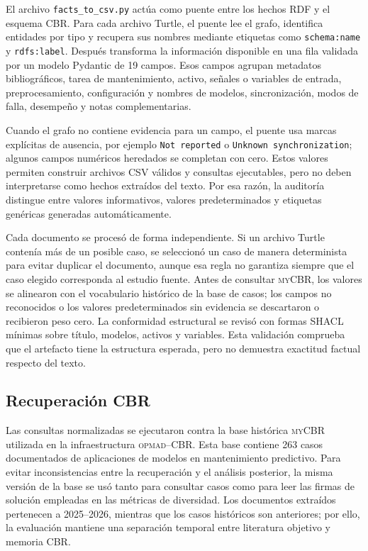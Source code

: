 \documentclass[11pt,a4paper]{article}
\newcommand{\OPMAD}{\textsc{opmad}}
\newcommand{\myCBR}{\textsc{myCBR}}
\begin{document}
El archivo \texttt{facts\_to\_csv.py} actúa como puente entre los hechos RDF y el esquema CBR. Para cada archivo Turtle, el puente lee el grafo, identifica entidades por tipo y recupera sus nombres mediante etiquetas como \texttt{schema:name} y \texttt{rdfs:label}. Después transforma la información disponible en una fila validada por un modelo Pydantic de 19 campos. Esos campos agrupan metadatos bibliográficos, tarea de mantenimiento, activo, señales o variables de entrada, preprocesamiento, configuración y nombres de modelos, sincronización, modos de falla, desempeño y notas complementarias.

Cuando el grafo no contiene evidencia para un campo, el puente usa marcas explícitas de ausencia, por ejemplo \texttt{Not reported} o \texttt{Unknown synchronization}; algunos campos numéricos heredados se completan con cero. Estos valores permiten construir archivos CSV válidos y consultas ejecutables, pero no deben interpretarse como hechos extraídos del texto. Por esa razón, la auditoría distingue entre valores informativos, valores predeterminados y etiquetas genéricas generadas automáticamente.

Cada documento se procesó de forma independiente. Si un archivo Turtle contenía más de un posible caso, se seleccionó un caso de manera determinista para evitar duplicar el documento, aunque esa regla no garantiza siempre que el caso elegido corresponda al estudio fuente. Antes de consultar \myCBR{}, los valores se alinearon con el vocabulario histórico de la base de casos; los campos no reconocidos o los valores predeterminados sin evidencia se descartaron o recibieron peso cero. La conformidad estructural se revisó con formas SHACL mínimas sobre título, modelos, activos y variables. Esta validación comprueba que el artefacto tiene la estructura esperada, pero no demuestra exactitud factual respecto del texto.

\subsection{Recuperación CBR}

Las consultas normalizadas se ejecutaron contra la base histórica \myCBR{} utilizada en la infraestructura \OPMAD{}--CBR. Esta base contiene 263 casos documentados de aplicaciones de modelos en mantenimiento predictivo. Para evitar inconsistencias entre la recuperación y el análisis posterior, la misma versión de la base se usó tanto para consultar casos como para leer las firmas de solución empleadas en las métricas de diversidad. Los documentos extraídos pertenecen a 2025--2026, mientras que los casos históricos son anteriores; por ello, la evaluación mantiene una separación temporal entre literatura objetivo y memoria CBR.
\end{document}
